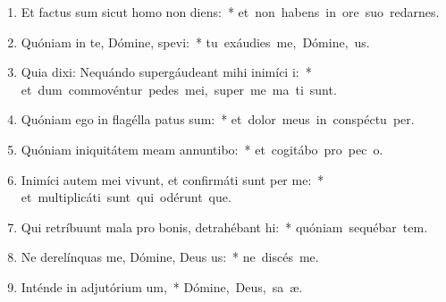 \begin{flushleft}
\begin{enumerate}[leftmargin=*]
\item Et factus sum sicut homo non diens:~* \mbox{et non habens in ore suo redarnes.}
\item Quóniam in te, Dómine, spevi:~* \mbox{tu exáudies me, Dómine,  us.}
\item Quia dixi: Nequándo supergáudeant mihi inimíci i:~* \mbox{et dum commovéntur pedes mei, super me ma ti sunt.}
\item Quóniam ego in flagélla patus sum:~* \mbox{et dolor meus in conspéctu  per.}
\item Quóniam iniquitátem meam annuntibo:~* \mbox{et cogitábo pro pec o.}
\item Inimíci autem mei vivunt, et confirmáti sunt per me:~* \mbox{et multiplicáti sunt qui odérunt  que.}
\item Qui retríbuunt mala pro bonis, detrahébant hi:~* \mbox{quóniam sequébar tem.}
\item Ne derelínquas me, Dómine, Deus us:~* \mbox{ne discés  me.}
\item Inténde in adjutórium um,~* \mbox{Dómine, Deus, sa æ.}

\end{enumerate}
\end{flushleft}

